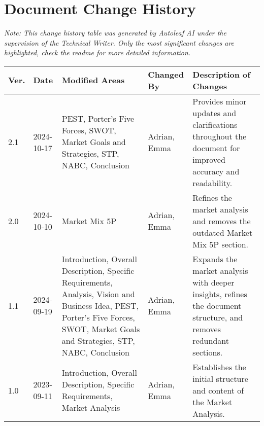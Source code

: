 \section{Document Change History}

\begin{center}
\small\textit{Note: This change history table was generated by Autoleaf AI under the supervision of the Technical Writer. Only the most significant changes are highlighted, check the readme for more detailed information.}

\vspace{0.5cm}

\begin{tabular}{|p{}|p{}|p{}|p{}|p{}|}
\hline
\textbf{Ver.} & \textbf{Date} & \textbf{Modified Areas} & \textbf{Changed By} & \textbf{Description of Changes} \\
\hline
2.1 & 2024-10-17 & PEST, Porter's Five Forces, SWOT, Market Goals and Strategies, STP, NABC, Conclusion & Adrian, Emma & Provides minor updates and clarifications throughout the document for improved accuracy and readability. \\
\hline
2.0 & 2024-10-10 & Market Mix 5P & Adrian, Emma & Refines the market analysis and removes the outdated Market Mix 5P section. \\
\hline
1.1 & 2024-09-19 & Introduction, Overall Description, Specific Requirements, Analysis, Vision and Business Idea, PEST, Porter's Five Forces, SWOT, Market Goals and Strategies, STP, NABC, Conclusion & Adrian, Emma & Expands the market analysis with deeper insights, refines the document structure, and removes redundant sections. \\
\hline
1.0 & 2023-09-11 & Introduction, Overall Description, Specific Requirements, Market Analysis & Adrian, Emma & Establishes the initial structure and content of the Market Analysis. \\
\hline
\end{tabular}
\end{center}

\vspace{1cm} 
